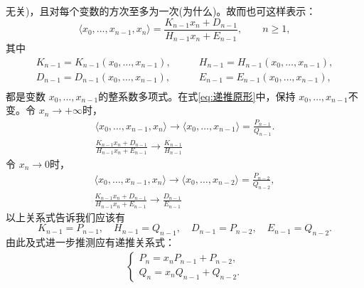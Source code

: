 \)无关)，且对每个变数的方次至多为一次(为什么)。故而也可这样表示：
\begin{equation}\label{eq:递推原形}
	\langle x_0, \dots, x_{n-1}, x_n \rangle = \frac{K_{n-1}x_n + D_{n-1}}{H_{n-1}x_n + E_{n-1}}, \qquad n \geqslant 1,
\end{equation}
其中
\begin{align*}
	K_{n-1} = K_{n-1}(x_0, \dots, x_{n-1}),\qquad & H_{n-1} = H_{n-1} (x_0, \dots, x_{n-1}), \\
	D_{n-1} = D_{n-1}(x_0, \dots, x_{n-1}),\qquad & E_{n-1} = E_{n-1} (x_0, \dots, x_{n-1}), \\
\end{align*}
都是变数 \( x_0, \dots, x_{n-1} \)的整系数多项式。在式\eqref{eq:递推原形}中，保持 \( x_0, \dots, x_{n-1} \)不变。令 \(
x_n \to + \infty \)时，
\begin{gather*}
	\langle x_0, \dots, x_{n-1}, x_n \rangle \to \langle x_0, \dots, x_{n-1} \rangle = \frac{P_{n-1}}{Q_{n-1}}. \\
	\frac{K_{n-1}x_n + D_{n-1}}{H_{n-1}x_n + E_{n-1}} \to \frac{K_{n-1}}{H_{n-1}}
\end{gather*}
令 \( x_n \to 0 \)时，
\begin{gather*}
	\langle x_0, \dots, x_{n-1}, x_n \rangle \to \langle x_0, \dots, x_{n-2} \rangle = \frac{P_{n-2}} {Q_{n-2}}, \\
	\frac{K_{n-1}x_n + D_{n-1}}{H_{n-1}x_n + E_{n-1}} \to \frac{D_{n-1}}{E_{n-1}}
\end{gather*}
以上关系式告诉我们应该有
\begin{equation*}
	K_{n-1} = P_{n-1}, \quad H_{n-1} = Q_{n-1}, \quad D_{n-1} = P_{n-2}, \quad E_{n-1} = Q_{n-2}.
\end{equation*}
由此及式进一步推测应有递推关系式：
\begin{align}\label{eq:递推}
	\begin{cases}
		P_n  = x_nP_{n-1} + P_{n-2}, \\
		Q_n  = x_nQ_{n-1} + Q_{n-2}.
	\end{cases}
\end{align}

